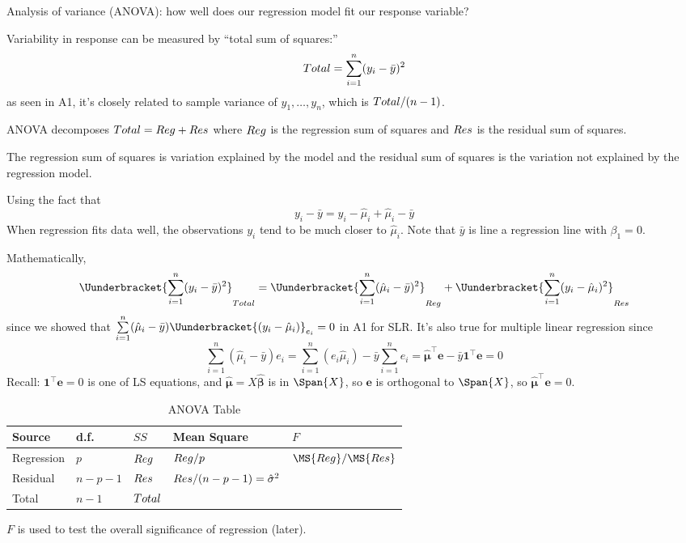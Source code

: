 Analysis of variance (ANOVA): how well
does our regression model fit our
response variable?

Variability in response can be measured by
``total sum of squares:''
\[ \relax{Total} =
    \sum\limits_{i=1}^{n} (y_i-\bar{y})^2 \]
as seen in A1, it's closely related to
sample variance of $ y_1,\ldots,y_n $,
which is $ \relax{Total}/(n-1) $.

ANOVA decomposes $ \relax{Total}=\relax{Reg}+\relax{Res} $
where $ \relax{Reg} $ is the regression sum of squares
and $ \relax{Res} $ is the residual sum of squares.

The regression sum of squares is variation explained by
the model
and the residual sum of squares is the variation not
explained by the regression model.

Using the fact that
\[ y_i-\bar{y}=y_i-\hat{\mu}_i+\hat{\mu}_i-\bar{y} \]
When regression fits data well,
the observations $ y_i $ tend to be much closer to $ \hat{\mu}_i $.
Note that $ \bar{y} $ is line a regression line with $ \beta_1=0 $.

Mathematically,
\[ \Uunderbracket{\sum\limits_{i=1}^{n} (y_i-\bar{y})^2}_{\SS{Total}}
    =\Uunderbracket{\sum\limits_{i=1}^{n} (\hat{\mu}_i-\bar{y})^2}_{\SS{Reg}}+
    \Uunderbracket{\sum\limits_{i=1}^{n} (y_i-\hat{\mu}_i)^2}_{\SS{Res}} \]
since we showed that $ \sum\limits_{i=1}^{n}(\hat{\mu}_i-\bar{y})
    \Uunderbracket{(y_i-\hat{\mu}_i)}_{e_i}=0 $ in A1 for SLR\@.
It's also true for multiple linear regression since
\[ \sum\limits_{i=1}^{n} (\hat{\mu}_i-\bar{y})e_i=
    \sum\limits_{i=1}^{n} (e_i\hat{\mu}_i)-\bar{y}\sum\limits_{i=1}^{n} e_i
    =\hat{\symbf{\mu}}^\top\symbf{e}-\bar{y}\symbf{1}^\top\symbf{e}=0 \]
Recall: $ \symbf{1}^\top\symbf{e}=0 $ is one of LS equations,
and $ \hat{\symbf{\mu}}=X\hat{\symbf{\beta}} $ is in $ \Span{X} $,
so $ \symbf{e} $ is orthogonal to $ \Span{X} $,
so $ \hat{\symbf{\mu}}^\top\symbf{e}=0 $.

\begin{table}[ht]
    \centering
    \caption{ANOVA Table}
    \begin{tabularx}{\linewidth}{@{}>{\hsize}Y>{\hsize}YYYY@{}}
        \toprule
        Source     & d.f.      & $ SS $         & Mean Square                         & $ F $                 \\
        \midrule
        Regression & $ p $     & $ \relax{Reg} $   & $ \relax{Reg}/p $                      & $ \MS{Reg}/\MS{Res} $ \\
        Residual   & $ n-p-1 $ & $ \relax{Res} $   & $ \relax{Res}/(n-p-1)=\hat{\sigma}^2 $                         \\
        \midrule
        Total      & $ n-1 $   & $ \relax{Total} $                                                               \\
        \bottomrule
    \end{tabularx}
\end{table}
$ F $ is used to test the overall significance of regression (later).

